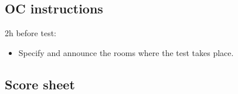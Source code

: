 \subsection{OC instructions}

2h before test:
\begin{itemize}
	\item Specify and announce the rooms where the test takes place.
\end{itemize}

\newpage
\subsection{Score sheet}
